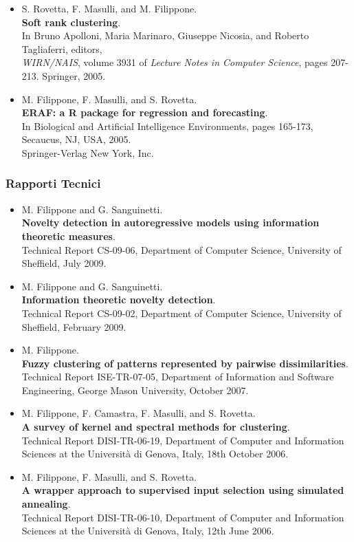 \documentclass[a4paper,10pt]{article}
\begin{document}
\begin{itemize}
     \item  S. Rovetta, F. Masulli, and M. Filippone.
       \\\textbf{Soft rank clustering}.
       \\In Bruno Apolloni, Maria Marinaro, Giuseppe Nicosia, and Roberto Tagliaferri, editors, 
       \\\emph{WIRN/NAIS}, volume 3931 of \emph{Lecture Notes in Computer Science}, pages 207-213. Springer, 2005.
     \item  M. Filippone, F. Masulli, and S. Rovetta.
       \\\textbf{ERAF: a R package for regression and forecasting}.
       \\In Biological and Artificial Intelligence Environments, pages 165-173, Secaucus, NJ, USA, 2005.
       \\Springer-Verlag New York, Inc.
\end{itemize}

\subsubsection*{Rapporti Tecnici}
\begin{itemize}
     \item  M. Filippone and G. Sanguinetti.
       \\\textbf{Novelty detection in autoregressive models using information theoretic measures}.
       \\Technical Report CS-09-06, Department of Computer Science, University of Sheffield, July 2009.
     \item  M. Filippone and G. Sanguinetti.
       \\\textbf{Information theoretic novelty detection}.
       \\Technical Report CS-09-02, Department of Computer Science, University of Sheffield, February 2009.
     \item  M. Filippone.
       \\\textbf{Fuzzy clustering of patterns represented by pairwise dissimilarities}.
       \\Technical Report ISE-TR-07-05, Department of Information and Software Engineering, George Mason University, October 2007.
     \item  M. Filippone, F. Camastra, F. Masulli, and S. Rovetta.
       \\\textbf{A survey of kernel and spectral methods for clustering}.
       \\Technical Report DISI-TR-06-19,
       Department of Computer and Information Sciences at the Universit\`a di Genova, Italy, 18th October 2006.
     \item  M. Filippone, F. Masulli, and S. Rovetta.
       \\\textbf{A wrapper approach to supervised input selection using simulated annealing}.
       \\Technical Report DISI-TR-06-10,
       Department of Computer and Information Sciences at the Universit\`a di Genova, Italy, 12th June 2006.
\end{itemize}
\end{document}
